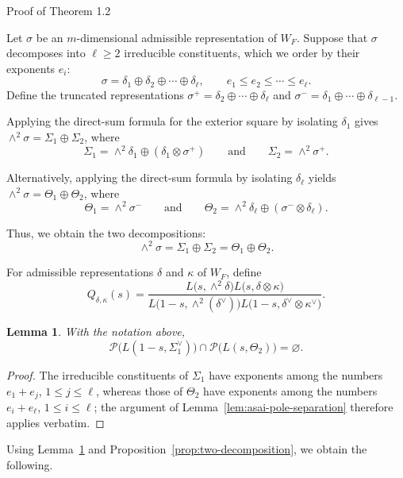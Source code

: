 \documentclass[12pt,reqno]{amsart}
\numberwithin{equation}{section}%
\numberwithin{equation}{subsection}
\newtheorem{lemma}[equation]{Lemma}
\theoremstyle{definition}
\theoremstyle{remark}
\begin{document}
\begin{section}{Proof of Theorem 1.2}\label{s5}

Let $\sigma$ be an $m$-dimensional admissible representation of $W_F$. Suppose that $\sigma$ decomposes into $\ell \geq 2$ irreducible constituents, which we order by their exponents $e_i$:
\[
  \sigma = \delta_1 \oplus \delta_2 \oplus \cdots \oplus \delta_\ell, \qquad e_1 \leq e_2 \leq \cdots \leq e_\ell.
\]
Define the truncated representations $\sigma^+ = \delta_2\oplus\cdots\oplus\delta_\ell$ and $\sigma^- = \delta_1\oplus\cdots\oplus\delta_{\ell-1}$.

Applying the direct-sum formula for the exterior square by isolating $\delta_1$ gives $\wedge^2\sigma = \Sigma_1 \oplus \Sigma_2$, where
\[
  \Sigma_1 = \wedge^2\delta_1 \oplus (\delta_1\otimes\sigma^+) \qquad\text{and}\qquad \Sigma_2 = \wedge^2\sigma^+.
\]

Alternatively, applying the direct-sum formula by isolating $\delta_\ell$ yields $\wedge^2\sigma = \Theta_1 \oplus \Theta_2$, where
\[
  \Theta_1 = \wedge^2\sigma^- \qquad\text{and}\qquad \Theta_2 = \wedge^2\delta_\ell \oplus (\sigma^-\otimes\delta_\ell).
\]

Thus, we obtain the two decompositions:
\[
  \wedge^2\sigma = \Sigma_1 \oplus \Sigma_2 = \Theta_1 \oplus \Theta_2.
\]

For admissible representations $\delta$ and $\kappa$ of $W_F$, define
\[
  Q_{\delta,\kappa}(s) = \frac{ L\bigl(s,\wedge^2\delta\bigr) L\bigl(s,\delta\otimes\kappa\bigr) }{ L\bigl(1-s,\wedge^2(\delta^\vee)\bigr) L\bigl(1-s,\delta^\vee\otimes\kappa^\vee\bigr) }.
\]

\begin{lemma}
\label{lem:exterior-square-pole-separation}
With the notation above,
\[
\mathcal{P}\bigl(L(1-s,\Sigma_1^\vee)\bigr)
\cap
\mathcal{P}\bigl(L(s,\Theta_2)\bigr)
=
\varnothing.
\]
\end{lemma}

\begin{proof}
The irreducible constituents of \(\Sigma_1\) have exponents among
the numbers \(e_1+e_j\), \(1\leq j\leq\ell\), whereas those of
\(\Theta_2\) have exponents among the numbers \(e_i+e_\ell\),
\(1\leq i\leq\ell\); the argument of
Lemma~\ref{lem:asai-pole-separation} therefore applies verbatim.
\end{proof}

Using Lemma~\ref{lem:exterior-square-pole-separation} and
Proposition~\ref{prop:two-decomposition}, we obtain the following.


\end{section}
\end{document}
